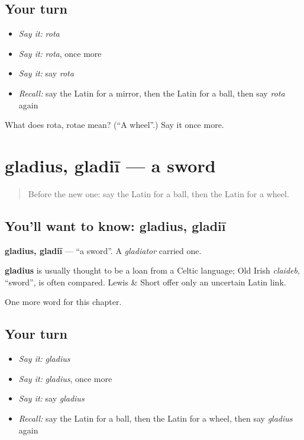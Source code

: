 \subsection*{Your turn}
\begin{itemize}
\raggedright
  \item \emph{Say it:} \emph{rota}
  \item \emph{Say it:} \emph{rota}, once more
  \item \emph{Say it:} say \emph{rota}
  \item \emph{Recall:} say the Latin for a mirror, then the Latin for a ball, then say \emph{rota} again
\end{itemize}

\begin{tcolorbox}[breakable,colback=teal!4,colframe=teal!35!black,title={Before you move on}]
What does rota, rotae mean? (\textquotedblleft{}A wheel\textquotedblright{}.) Say it once more.
\end{tcolorbox}
\section[gladius, gladiī]{gladius, gladiī — a sword}

\label{lesson:LA-C85-gladius}



\begin{quote}
Before the new one: say the Latin for a ball, then the Latin for a wheel.
\end{quote}

\subsection*{You'll want to know: gladius, gladiī}
\textbf{gladius, gladiī} — \textquotedblleft{}a sword\textquotedblright{}. A \emph{gladiator} carried one.

\begin{cousinweb}
\textbf{gladius} is usually thought to be a loan from a Celtic language; Old Irish \emph{claideb}, \textquotedblleft{}sword\textquotedblright{}, is often compared. Lewis \& Short offer only an uncertain Latin link.
\end{cousinweb}

\begin{grammarlens}[title={What you've built}]
One more word for this chapter.
\end{grammarlens}

\subsection*{Your turn}
\begin{itemize}
\raggedright
  \item \emph{Say it:} \emph{gladius}
  \item \emph{Say it:} \emph{gladius}, once more
  \item \emph{Say it:} say \emph{gladius}
  \item \emph{Recall:} say the Latin for a ball, then the Latin for a wheel, then say \emph{gladius} again
\end{itemize}

